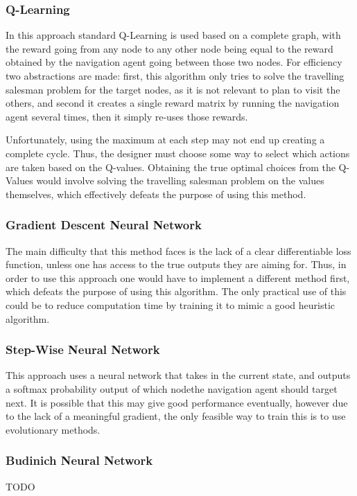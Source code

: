 \documentclass{article}
\begin{document}
\subsubsection{Q-Learning}
In this approach standard Q-Learning is used based on a complete graph, with the reward going from any node to any other node being equal to the reward obtained by the navigation agent going between those two nodes. For efficiency two abstractions are made: first, this algorithm only tries to solve the travelling salesman problem for the target nodes, as it is not relevant to plan to visit the others, and second it creates a single reward matrix by running the navigation agent several times, then it simply re-uses those rewards.

Unfortunately, using the maximum at each step may not end up creating a complete cycle. Thus, the designer must choose some way to select which actions are taken based on the Q-values. Obtaining the true optimal choices from the Q-Values would involve solving the travelling salesman problem on the values themselves, which effectively defeats the purpose of using this method.

\subsubsection{Gradient Descent Neural Network}
The main difficulty that this method faces is the lack of a clear differentiable loss function, unless one has access to the true outputs they are aiming for. Thus, in order to use this approach one would have to implement a different method first, which defeats the purpose of using this algorithm. The only practical use of this could be to reduce computation time by training it to mimic a good heuristic algorithm.

\subsubsection{Step-Wise Neural Network}
This approach uses a neural network that takes in the current state, and outputs a softmax probability output of which nodethe navigation agent should target next. It is possible that this may give good performance eventually, however due to the lack of a meaningful gradient, the only feasible way to train this is to use evolutionary methods.

\subsubsection{Budinich Neural Network}
TODO
\end{document}
